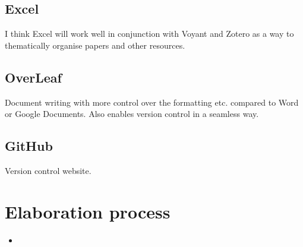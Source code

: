 \documentclass{article}
\begin{document}
\subsection{Excel}

I think Excel will work well in conjunction with Voyant and Zotero as a way to thematically organise papers and other resources.

\subsection{OverLeaf}

Document writing with more control over the formatting etc. compared to Word or Google Documents. Also enables version control in a seamless way.

\subsection{GitHub}

Version control website.

\section{Elaboration process}

\begin{itemize}
    \item 
\end{itemize}
\end{document}
